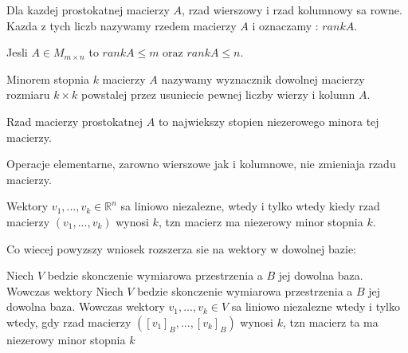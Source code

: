\documentclass{article}
\begin{document}
\begin{tcolorbox}[colback=white!90!green,colframe=black!35!green,title=Wnioski 2.34-2.35 Rzad macierzy i maksymalny rzad macierzy]

Dla kazdej prostokatnej macierzy $A$, rzad wierszowy i rzad kolumnowy sa rowne. Kazda z tych liczb nazywamy rzedem macierzy $A$ i oznaczamy : $rankA$.

Jesli $A \in M_{m \times n}$ to $rankA \leq m \text{ oraz } rankA \leq n$.

\end{tcolorbox}

\begin{tcolorbox}[colback=white!90!red,colframe=black!35!red,title=Definicja 2.36 Minor]

Minorem stopnia $k$ macierzy $A$ nazywamy wyznacznik dowolnej macierzy rozmiaru $k \times k$ powstalej przez usuniecie pewnej liczby wierzy i kolumn $A$.

\end{tcolorbox} 

\begin{tcolorbox}[colback=white!90!green,colframe=black!35!green,title=Fakt2.3? Rzad macierzy c.d.] 
Rzad macierzy prostokatnej $A$ to najwiekszy stopien niezerowego minora tej macierzy.

Operacje elementarne, zarowno wierszowe jak i kolumnowe, nie zmieniaja rzadu macierzy.

\end{tcolorbox}

\begin{tcolorbox}[colback=white!90!green,colframe=black!35!green,title=Wniosek laczacy liniowa niezaleznosc.]

Wektory $v_{1},...,v_{k} \in \mathbb{R}^{n}$ sa liniowo niezalezne, wtedy i tylko wtedy kiedy rzad macierzy $(v_{1},...,v_{k})$ wynosi $k$, tzn macierz ma niezerowy minor stopnia $k$.
 
Co wiecej powyzszy wniosek rozszerza sie na wektory w dowolnej bazie:

Niech $V$ bedzie skonczenie wymiarowa przestrzenia a $B$ jej dowolna baza. Wowczas wektory 
Niech $V$ bedzie skonczenie wymiarowa przestrzenia a $B$ jej dowolna baza. Wowczas wektory $v_{1},...,v_{k} \in V$ sa liniowo niezalezne wtedy i tylko wtedy, gdy rzad macierzy $([v_{1}]_{B}, ... , [v_{k}]_{B})$ wynosi $k$, tzn macierz ta ma niezerowy minor stopnia $k$ 

\end{tcolorbox}
\end{document}
